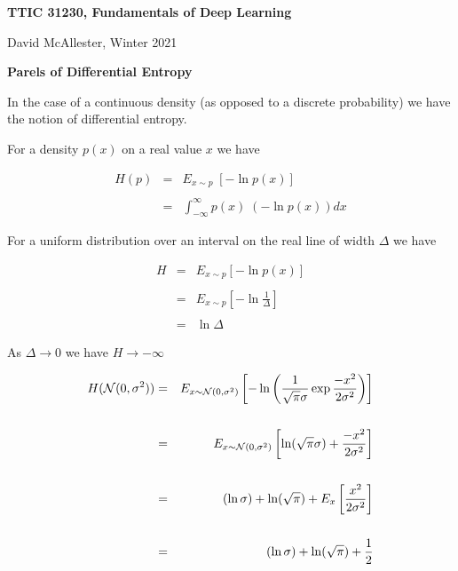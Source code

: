 




{\Huge

  \centerline{\bf TTIC 31230, Fundamentals of Deep Learning}
  \bigskip
  \centerline{David McAllester, Winter 2021}
  \vfill
  \centerline{\bf Parels of Differential Entropy}
  \vfill
\vfill
\vfill


In the case of a continuous density (as opposed to a discrete probability) we have the notion of differential entropy.

\vfill
For a density $p(x)$ on a real value $x$ we have

\vfill
\begin{eqnarray*}
H(p) & = & E_{x \sim p}\;\left[-\ln p(x)\right] \\
\\
& = &\int_{-\infty}^\infty p(x) \;(-\ln p(x)) dx
\end{eqnarray*}


For a uniform distribution over an interval on the real line of width $\Delta$ we have

\begin{eqnarray*}
H & = & E_{x \sim p} \left[-\ln p(x)\right] \\
\\
& = & E_{x \sim p} \left[-\ln \frac{1}{\Delta}\right] \\
\\
& = & \ln \Delta
\end{eqnarray*}

\vfill
\centerline{As $\Delta \rightarrow 0$ we have $H \rightarrow -\infty$}


\hfill

{\huge
\begin{eqnarray*}
H({\cal N}(0,\sigma^2)) & = & E_{x \sim {\cal N}(0,\sigma^2)} \left[ -\ln \left(\frac{1}{\sqrt{\pi}\sigma} \exp{\frac{-x^2}{2\sigma^2}}\right)\right] \\
\\
& =& E_{x \sim {\cal N}(0,\sigma^2)} \left[ \ln (\sqrt{\pi}\sigma) + \frac{-x^2}{2\sigma^2}\right] \\
\\
& = & (\ln\sigma) + \ln(\sqrt{\pi}) + E_x \left[\frac{x^2}{2\sigma^2}\right] \\
\\
& = & (\ln\sigma) + \ln(\sqrt{\pi}) + \frac{1}{2} \\
\end{eqnarray*}
}

}
